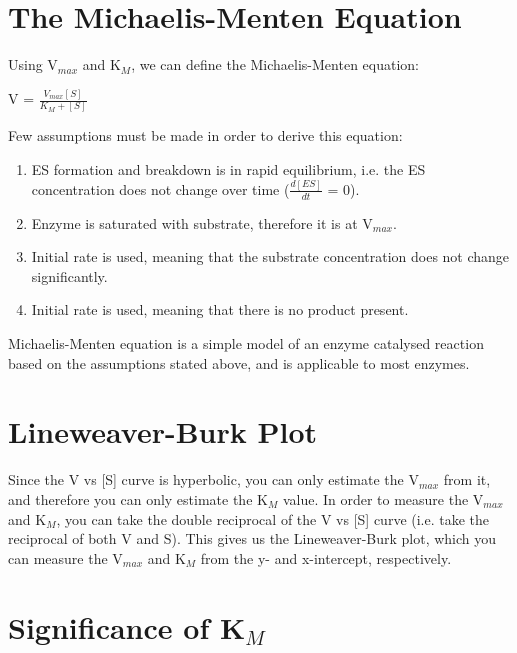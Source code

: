 \section{The Michaelis-Menten Equation}

Using V$_{max}$ and K$_M$, we can define the Michaelis-Menten equation:

\begin{center}
\large{V = $\frac{V_{max} [S]}{K_M + [S]}$}
\end{center}

Few assumptions must be made in order to derive this equation:
\begin{center}
\end{center}
\begin{enumerate}
\item ES formation and breakdown is in rapid equilibrium, i.e. the ES concentration does not change over time ({$\frac{d[ES]}{dt}$} = 0).
\item Enzyme is saturated with substrate, therefore it is at V$_{max}$.
\item Initial rate is used, meaning that the substrate concentration does not change significantly.
\item Initial rate is used, meaning that there is no product present.
\end{enumerate}

Michaelis-Menten equation is a simple model of an enzyme catalysed reaction based on the assumptions stated above, and is applicable to most enzymes.

\section{Lineweaver-Burk Plot}

\begin{center}
\end{center}

Since the V vs [S] curve is hyperbolic, you can only estimate the V$_{max}$ from it, and therefore you can only estimate the K$_M$ value.
In order to measure the V$_{max}$ and K$_M$, you can take the double reciprocal of the V vs [S] curve (i.e. take the reciprocal of both V and S).
This gives us the Lineweaver-Burk plot, which you can measure the V$_{max}$ and K$_M$ from the y- and x-intercept, respectively.

\section{Significance of K$_M$}

